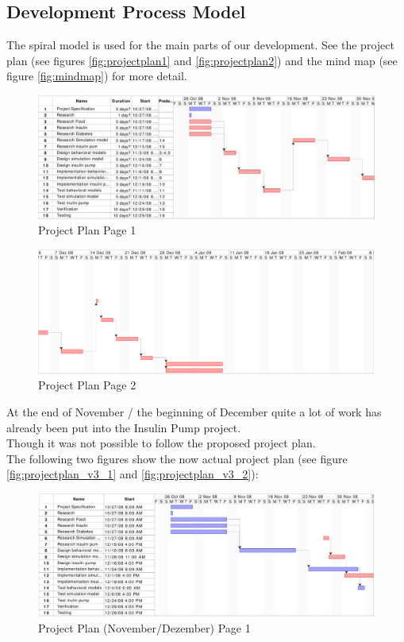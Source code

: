 \documentclass[pdflatex,a4paper,11pt,english]{scrreprt}
\begin{document}
\newpage
\subsection{Development Process Model}
The spiral model is used for the main parts of our development.
See the project plan (see figures \vref{fig:projectplan1} and \vref{fig:projectplan2}) and the
mind map (see figure \vref{fig:mindmap}) for more detail.

\begin{figure}[htb]
\centering
\includegraphics[width=\textwidth]{images/projectplan_page1}
\caption{Project Plan Page 1}
\label{fig:projectplan1}
\end{figure}

\begin{figure}[htb]
\centering
\includegraphics[width=\textwidth]{images/projectplan_page2}
\caption{Project Plan Page 2}
\label{fig:projectplan2}
\end{figure}

\newpage
At the end of November / the beginning of December quite a lot of work has
already been put into the Insulin Pump project. \\
Though it was not possible to follow the proposed project plan. \\
The following two figures show the now actual project plan (see figure
\vref{fig:projectplan_v3_1} and \vref{fig:projectplan_v3_2}):

\begin{figure}[htb]
\centering
\includegraphics[width=\textwidth]{images/projectplan_v3_page1}
\caption{Project Plan (November/Dezember) Page 1}
\label{fig:projectplan_v3_1}
\end{figure}
\end{document}
